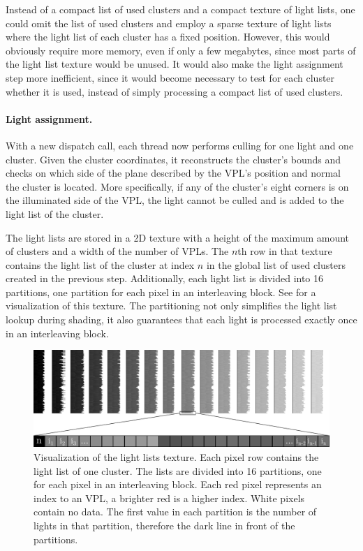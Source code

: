 Instead of a compact list of used clusters and a compact texture of light lists, one could omit the list of used clusters and employ a sparse texture of light lists where the light list of each cluster has a fixed position. However, this would obviously require more memory, even if only a few megabytes, since most parts of the light list texture would be unused. It would also make the light assignment step more inefficient, since it would become necessary to test for each cluster whether it is used, instead of simply processing a compact list of used clusters.


\paragraph{Light assignment.}
With a new dispatch call, each thread now performs culling for one light and one cluster. Given the cluster coordinates, it reconstructs the cluster's bounds and checks on which side of the plane described by the VPL's position and normal the cluster is located. More specifically, if any of the cluster's eight corners is on the illuminated side of the VPL, the light cannot be culled and is added to the light list of the cluster.

The light lists are stored in a 2D texture with a height of the maximum amount of clusters and a width of the number of VPLs. The $n$th row in that texture contains the light list of the cluster at index $n$ in the global list of used clusters created in the previous step. Additionally, each light list is divided into 16 partitions, one partition for each pixel in an interleaving block. See  for a visualization of this texture. The partitioning not only simplifies the light list lookup during shading, it also guarantees that each light is processed exactly once in an interleaving block.

\begin{figure}[h]
    \includegraphics[width=\textwidth]{graphics/light_lists}
    \caption{Visualization of the light lists texture. Each pixel row contains the light list of one cluster. The lists are divided into 16 partitions, one for each pixel in an interleaving block. Each red pixel represents an index to an VPL, a brighter red is a higher index. White pixels contain no data. The first value in each partition is the number of lights in that partition, therefore the dark line in front of the partitions.}
    \label{fig:impl:light_lists}
\end{figure}

